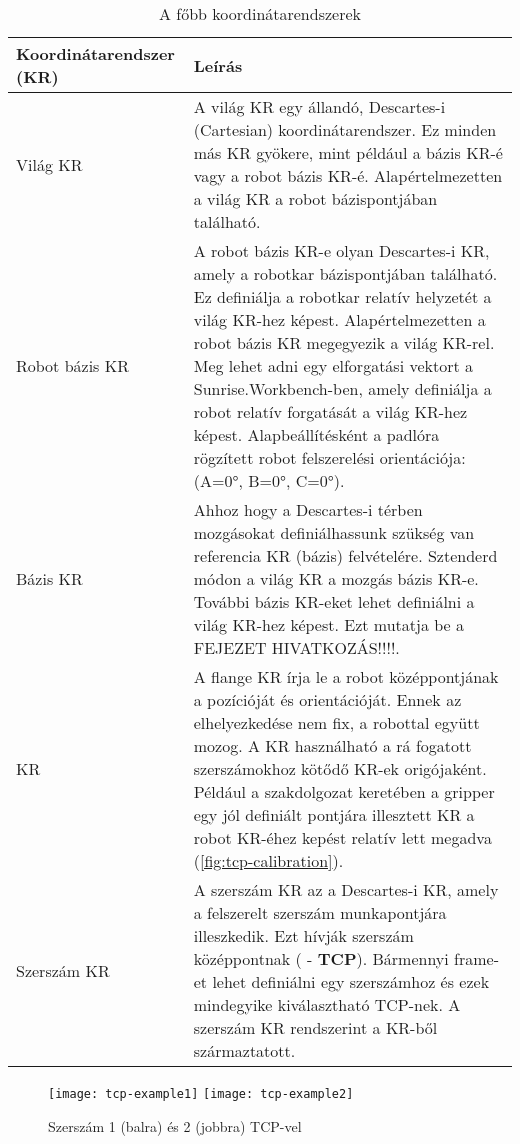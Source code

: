 \documentclass[../documentation.tex]{subfiles}
\begin{document}
\begin{table}[h]
\setlength\arrayrulewidth{1pt}
\begin{tabu} to\linewidth{| X[1.4,c,m] | X[3,l,m] |}
\hline
\rowfont{\bfseries\large} Koordinátarendszer (KR) & Leírás \\ \hline
Világ KR & A világ KR egy állandó, Descartes-i (Cartesian) koordinátarendszer. Ez minden más KR gyökere, mint például a bázis KR-é vagy a robot bázis KR-é. Alapértelmezetten a világ KR a robot bázispontjában található. \\ \hline
Robot bázis KR & A robot bázis KR-e olyan Descartes-i KR, amely a robotkar bázispontjában található. Ez definiálja a robotkar relatív helyzetét a világ KR-hez képest. Alapértelmezetten a robot bázis KR megegyezik a világ KR-rel. Meg lehet adni egy elforgatási vektort a Sunrise.Workbench-ben, amely definiálja a robot relatív forgatását a világ KR-hez képest. Alapbeállítésként a padlóra rögzített robot felszerelési orientációja: (A=0°, B=0°, C=0°).\\ \hline
Bázis KR & Ahhoz hogy a Descartes-i térben mozgásokat definiálhassunk szükség van referencia KR (bázis) felvételére. Sztenderd módon a világ KR a mozgás bázis KR-e. További bázis KR-eket lehet definiálni a világ KR-hez képest. Ezt mutatja be a FEJEZET HIVATKOZÁS!!!!. \\ \hline
{} KR & A flange KR írja le a robot  középpontjának a pozícióját és orientációját. Ennek az elhelyezkedése nem fix, a robottal együtt mozog. A  KR használható a rá fogatott szerszámokhoz kötődő KR-ek origójaként. Például a szakdolgozat keretében a gripper egy jól definiált pontjára illesztett KR a robot  KR-éhez kepést relatív lett megadva (\ref{fig:tcp-calibration}). \\ \hline
Szerszám KR & A szerszám KR az a Descartes-i KR, amely a felszerelt szerszám munkapontjára illeszkedik. Ezt hívják szerszám középpontnak ( - \textbf{TCP}). Bármennyi frame-et lehet definiálni egy szerszámhoz és ezek mindegyike kiválasztható TCP-nek. A szerszám KR rendszerint a  KR-ből származtatott. \\ \hline
\end{tabu}
\caption{A főbb koordinátarendszerek}
\label{tab:coordsystems}
\end{table}

\begin{figure}
	\centering
	\texttt{[image: tcp-example1]}
	\texttt{[image: tcp-example2]}
	\caption{Szerszám 1 (balra) és 2 (jobbra) TCP-vel\cite{sunrisemanual}}
	\label{fig:tcp-examples}
\end{figure}
\end{document}
